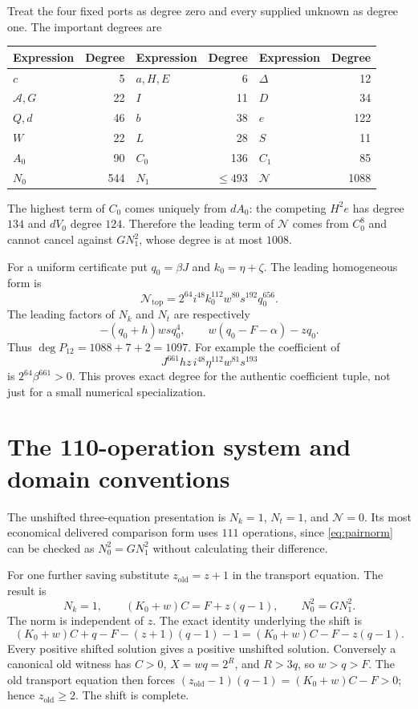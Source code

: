 \documentclass[11pt]{article}
\theoremstyle{remark}\newtheorem{remark}[theorem]{Remark}
\begin{document}
Treat the four fixed ports as degree zero and every supplied unknown as
degree one. The important degrees are
\begin{center}
\begin{tabular}{@{}lr@{\qquad}lr@{\qquad}lr@{}}\toprule
Expression&Degree&Expression&Degree&Expression&Degree\\\midrule
$c$&5&$a,H,E$&6&$\Delta$&12\\
$\mathcal A,G$&22&$I$&11&$D$&34\\
$Q,d$&46&$b$&38&$e$&122\\
$W$&22&$L$&28&$S$&11\\
$A_0$&90&$C_0$&136&$C_1$&85\\
$N_0$&544&$N_1$&$\leq493$&$\mathcal N$&1088\\\bottomrule
\end{tabular}
\end{center}
The highest term of $C_0$ comes uniquely from $dA_0$: the competing
$H^2e$ has degree $134$ and $dV_0$ degree $124$. Therefore the leading
term of $\mathcal N$ comes from $C_0^8$ and cannot cancel against
$GN_1^2$, whose degree is at most $1008$.

For a uniform certificate put $q_0=\beta J$ and $k_0=\eta+\zeta$.
The leading homogeneous form is
\[
 \mathcal N_{\mathrm{top}}=
 2^{64}i^{48}k_0^{112}w^{80}s^{192}q_0^{656}.
\]
The leading factors of $N_k$ and $N_t$ are respectively
\[
 -(q_0+h)wsq_0^4,
 \qquad w(q_0-F-\alpha)-zq_0.
\]
Thus $\deg P_{12}=1088+7+2=1097$. For example the coefficient of
\[
 J^{661}hz\,i^{48}\eta^{112}w^{81}s^{193}
\]
is $2^{64}\beta^{661}>0$. This proves exact degree for the authentic
coefficient tuple, not just for a small numerical specialization.

\section{The 110-operation system and domain conventions}
\label{sec:systems}

The unshifted three-equation presentation is
$N_k=1$, $N_t=1$, and $\mathcal N=0$. Its most economical delivered
comparison form uses $111$ operations, since \eqref{eq:pairnorm} can be
checked as $N_0^2=GN_1^2$ without calculating their difference.

For one further saving substitute $z_{\mathrm{old}}=z+1$ in the
transport equation. The result is
\begin{equation}
 \boxed{\quad N_k=1,\qquad (K_0+w)C=F+z(q-1),\qquad
                  N_0^2=GN_1^2.\quad}\label{eq:system}
\end{equation}
The norm is independent of $z$. The exact identity underlying the shift is
\[
 (K_0+w)C+q-F-(z+1)(q-1)-1
 =(K_0+w)C-F-z(q-1).
\]
Every positive shifted solution gives a positive unshifted solution.
Conversely a canonical old witness has $C>0$, $X=wq=2^R$, and $R>3q$,
so $w>q>F$. The old transport equation then forces
$(z_{\mathrm{old}}-1)(q-1)=(K_0+w)C-F>0$; hence
$z_{\mathrm{old}}\geq2$. The shift is complete.
\end{document}
